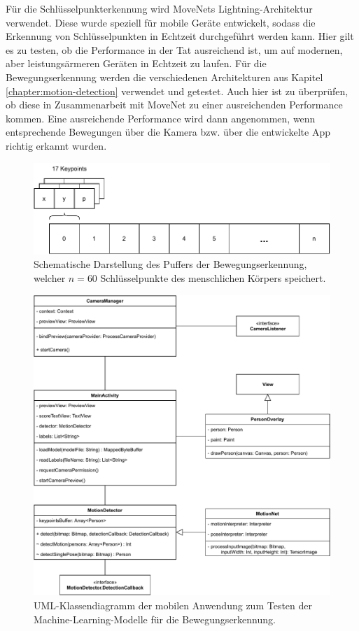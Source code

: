 Für die Schlüsselpunkterkennung wird MoveNets Lightning-Architektur
\cite{movenet} verwendet. Diese wurde speziell für mobile Geräte entwickelt,
sodass die Erkennung von Schlüs\-sel\-punk\-ten in Echtzeit durchgeführt werden
kann. Hier gilt es zu testen, ob die Performance in der Tat ausreichend ist, um
auf modernen, aber leistungsärmeren Geräten in Echtzeit zu laufen. Für die
Bewegungserkennung werden die verschiedenen Architekturen aus Kapitel
\ref{chapter:motion-detection} verwendet und getestet. Auch hier ist zu
überprüfen, ob diese in Zusammenarbeit mit MoveNet zu einer ausreichenden
Performance kommen. Eine ausreichende Performance wird dann angenommen, wenn
entsprechende Bewegungen über die Kamera bzw. über die entwickelte App richtig
erkannt wurden.

\begin{figure}
    \includegraphics[width=\textwidth]{images/camera_frame_buffer.pdf}
    \caption{Schematische Darstellung des Puffers der Bewegungserkennung,
    welcher $n = 60$ Schlüsselpunkte des menschlichen Körpers speichert.}
\end{figure}

\begin{figure}
    \includegraphics[width=\textwidth]{images/app_uml.pdf}
    \caption{UML-Klassendiagramm der mobilen Anwendung zum Testen der
    Machine-Learning-Modelle für die Bewegungserkennung.}
\end{figure}

